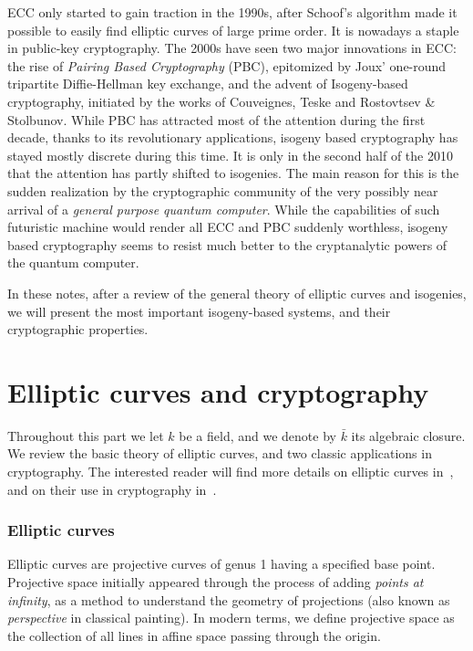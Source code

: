 \documentclass[10pt]{article}
\theoremstyle{plain}
\theoremstyle{definition}
\begin{document}
ECC only started to gain traction in the 1990s, after Schoof's
algorithm made it possible to easily find elliptic curves of large
prime order. %
It is nowadays a staple in public-key cryptography. %
The 2000s have seen two major innovations in ECC: the rise of
\emph{Pairing Based Cryptography} (PBC), epitomized by Joux' one-round
tripartite Diffie-Hellman key exchange, and the advent of
Isogeny-based cryptography, initiated by the works of Couveignes,
Teske and Rostovtsev \& Stolbunov. %
While PBC has attracted most of the attention during the first decade,
thanks to its revolutionary applications, isogeny based cryptography
has stayed mostly discrete during this time. %
It is only in the second half of the 2010 that the attention has
partly shifted to isogenies. %
The main reason for this is the sudden realization by the
cryptographic community of the very possibly near arrival of a
\emph{general purpose quantum computer}. %
While the capabilities of such futuristic machine would render all ECC
and PBC suddenly worthless, isogeny based cryptography seems to resist
much better to the cryptanalytic powers of the quantum computer.

In these notes, after a review of the general theory of elliptic
curves and isogenies, we will present the most important isogeny-based
systems, and their cryptographic properties.

{
  \hypersetup{linkcolor=black}
  \setcounter{tocdepth}{1}
  \tableofcontents
}


\clearpage
\part{Elliptic curves and cryptography}

Throughout this part we let $k$ be a field, and we denote by
$\bar{k}$ its algebraic closure. %
We review the basic theory of elliptic curves, and two classic
applications in cryptography. %
The interested reader will find more details on elliptic curves
in~\cite{silverman:elliptic}, and on their use in cryptography
in~\cite{joux2009algorithmic,galbraith2012mathematics}.

\section{Elliptic curves}

Elliptic curves are projective curves of genus 1 having a specified
base point. %
Projective space initially appeared through the process of adding
\emph{points at infinity}, as a method to understand the geometry of
projections (also known as \emph{perspective} in classical
painting). %
In modern terms, we define projective space as the collection of all
lines in affine space passing through the origin.
\end{document}
